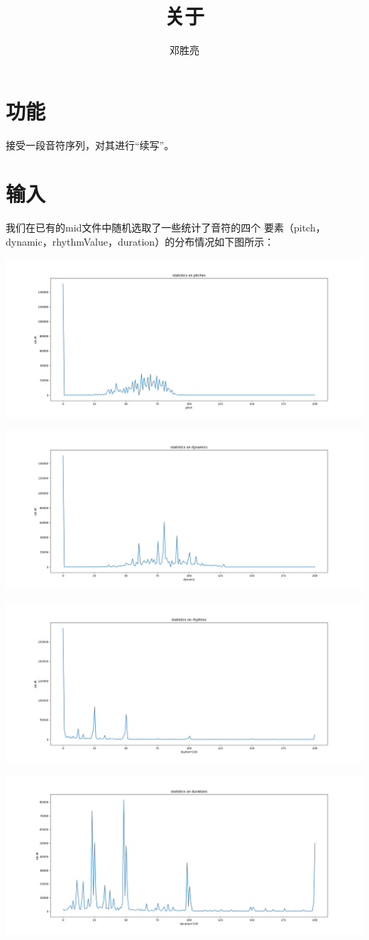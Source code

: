 \documentclass{article}
\title{关于}
\author{邓胜亮}
\begin{document}
  \section{功能}
    接受一段音符序列，对其进行“续写”。
  \section{输入}
    我们在已有的mid文件中随机选取了一些统计了音符的四个
    要素（pitch，dynamic，rhythmValue，duration）的分布情况如下图所示：
    
    \includegraphics[width=.95\textwidth]{picture/pitches.png}
      
    \includegraphics[width=.95\textwidth]{picture/dynamics.png}

    \includegraphics[width=.95\textwidth]{picture/rhythms.png}
    
    \includegraphics[width=.95\textwidth]{picture/durations.png}
\end{document}
